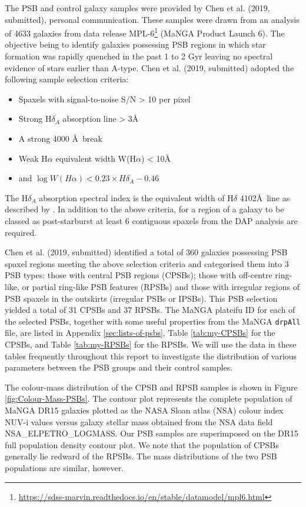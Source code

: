 The PSB and control galaxy samples were provided by Chen et al. (2019, submitted), personal communication. These samples were drawn from an analysis of 4633 galaxies from data release  MPL-6\footnote{\href{}{https://sdss-marvin.readthedocs.io/en/stable/datamodel/mpl6.html}} (MaNGA Product Launch 6). The objective being to identify galaxies possessing PSB regions in which star formation was rapidly quenched in the past 1 to 2 Gyr leaving no spectral evidence of stars earlier than A-type.  Chen et al. (2019, submitted) adopted the following sample selection criteria:
\begin{itemize}
    \item Spaxels with signal-to-noise S/N > 10 per pixel
    \item Strong H$\delta_A$ absorption line > 3\AA 
    \item A strong 4000 \AA\ break 
    \item Weak H$\alpha$ equivalent width W(H$\alpha$) < 10\AA
    \item and $\log{W(H\alpha)} < 0.23\times{H\delta_A}-0.46$
\end{itemize}
The H$\delta_A$ absorption spectral index is the equivalent width of H$\delta$ 4102\AA\ line as described by \citet{1994ApJS...94..687W}. In addition to the above criteria, for a region of a galaxy to be classed as post-starburst at least 6 contiguous spaxels from the DAP analysis are required. 

Chen et al. (2019, submitted) identified a total of 360 galaxies possessing PSB spaxel regions meeting the above selection criteria and categorised them into 3 PSB types: those with central PSB regions (CPSBs); those with off-centre ring-like, or partial ring-like PSB features (RPSBs) and those with irregular regions of PSB spaxels in the outskirts (irregular PSBs or IPSBs). This PSB selection yielded a total of 31 CPSBs and 37 RPSBs. The MaNGA plateifu ID for each of the selected PSBs, together with some useful properties from the MaNGA \texttt{drpAll} file, are listed in Appendix \ref{sec:lists-of-psbs}, Table \ref{tab:my-CPSBs} for the CPSBs, and Table \ref{tab:my-RPSBs} for the RPSBs. We will use the data in these tables frequently throughout this report to investigate the distribution of various parameters between the PSB groups and their control samples.

The colour-mass distribution of the CPSB and RPSB samples is shown in Figure \ref{fig:Colour-Mass-PSBs}. The contour plot represents the complete population of MaNGA DR15 galaxies plotted as the NASA Sloan atlas (NSA) colour index NUV-i values versus galaxy stellar mass obtained from the NSA data field  NSA\_ELPETRO\_LOGMASS. Our PSB samples are superimposed on the DR15 full population density contour plot. We note that the population of CPSBs generally lie redward of the RPSBs. The mass distributions of the two PSB populations are similar, however.

